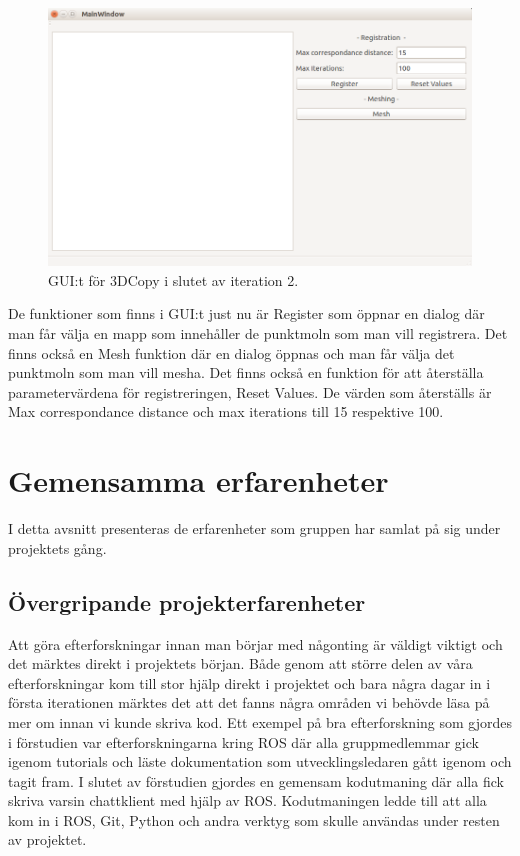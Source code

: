 \begin{figure}[H]
	\centering
	\includegraphics[width=130mm]{figures/3DCopyGUI.PNG}
	\caption{GUI:t för 3DCopy i slutet av iteration 2.}
	\label{fig:3dcopy_gui_res}
\end{figure}

De funktioner som finns i GUI:t just nu är Register som öppnar en dialog där man får välja en mapp som innehåller de punktmoln som man vill registrera. Det finns också en Mesh funktion där en dialog öppnas och man får välja det punktmoln som man vill mesha. Det finns också en funktion för att återställa parametervärdena för registreringen, Reset Values. De värden som återställs är Max correspondance distance och max iterations till 15 respektive 100.

\section{Gemensamma erfarenheter}

I detta avsnitt presenteras de erfarenheter som gruppen har samlat på sig under projektets gång.

\subsection{Övergripande projekterfarenheter}

Att göra efterforskningar innan man börjar med någonting är väldigt viktigt och det märktes direkt i projektets början. Både genom att större delen av våra efterforskningar kom till stor hjälp direkt i projektet och bara några dagar in i första iterationen märktes det att det fanns några områden vi behövde läsa på mer om innan vi kunde skriva kod. Ett exempel på bra efterforskning som gjordes i förstudien var efterforskningarna kring ROS där alla gruppmedlemmar gick igenom tutorials och läste dokumentation som utvecklingsledaren gått igenom och tagit fram. I slutet av förstudien gjordes en gemensam kodutmaning där alla fick skriva varsin chattklient med hjälp av ROS. Kodutmaningen ledde till att alla kom in i ROS, Git, Python och andra verktyg som skulle användas under resten av projektet.


